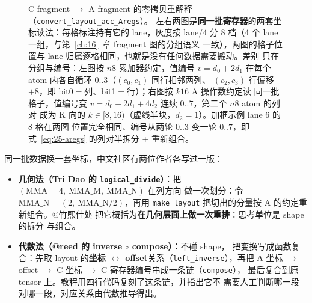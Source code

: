 \begin{figure}[H]
\caption{C fragment $\to$ A fragment 的零拷贝重解释
（\texttt{convert\_\allowbreak{}layout\_\allowbreak{}acc\_\allowbreak{}Aregs}）。
左右两图是\textbf{同一批寄存器}的两套坐标读法：每格标注持有它的 lane，灰度按
$\mathrm{lane}/4$ 分 8 档（4 个 lane 一组，与第~\ref{ch:16}~章 fragment 图的分组语义
一致），两图的格子位置与 lane 归属逐格相同，也就是没有任何数据需要搬动。差别
只在分组与编号：左图按 $n8$ 累加器约定，值编号
$v=d_0+2d_1$ 在每个 atom 内各自循环 $0..3$（$(c_0,c_1)$ 同行相邻两列、
$(c_2,c_3)$ 行偏移 $+8$，即 bit0$=$列、bit1$=$行）；右图按 $k16$ A 操作数约定读
同一批格子，值编号变 $v=d_0+2d_1+4d_2$ 连续 $0..7$，第二个 $n8$ atom 的列对
成为 K 向的 $k\in[8,16)$（虚线半块，$d_2{=}1$）。加框示例 lane 6 的 8 格在两图
位置完全相同、编号从两轮 $0..3$ 变一轮 $0..7$，即式~\eqref{eq:25-aregs}
的列对半拆分 + 重新组合。}
\label{fig:25-c2aregs}
\end{figure}

同一批数据换一套坐标，中文社区有两位作者各写过一版：

\begin{itemize}[itemsep=2pt,topsep=2pt]
  \item \textbf{几何法（Tri Dao 的 \texttt{logical\_\allowbreak{}divide}）}：把
        $(\mathrm{MMA}{=}4,\ \mathrm{MMA\_M},\ \mathrm{MMA\_N})$ 在列方向
        做一次划分：令 $\mathrm{MMA\_N}=(2,\ \mathrm{MMA\_N}/2)$，再用
        \texttt{make\_layout} 把切出的分量按 A 的约定重新组合。@竹熙佳处
        把它概括为\textbf{在几何层面上做一次重排}：思考单位是 shape 的拆分
        与组合。
  \item \textbf{代数法（@reed 的 inverse $\circ$ compose）}：不碰 shape，
        把变换写成函数复合：先取 layout 的\textbf{坐标 $\leftrightarrow$
        offset}关系（\texttt{left\_\allowbreak{}inverse}），再把 A 坐标 $\to$ offset
        $\to$ C 坐标 $\to$ C 寄存器编号串成一条链（\texttt{compose}），
        最后复合到原 tensor 上。教程用四行代码复刻了这条链，并指出它不
        需要人工判断哪一段对哪一段，对应关系由代数推导得出。
\end{itemize}

